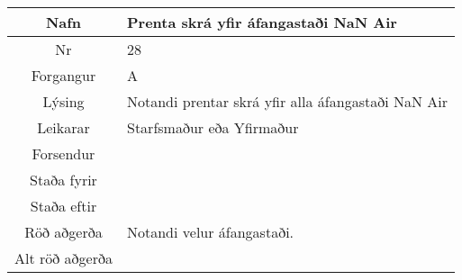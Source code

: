\documentclass[a4paper]{article}
\begin{document}
\begin{tabular}{|c|p{10cm}|}
\hline
Nafn&Prenta skrá yfir áfangastaði NaN Air\\
\hline
Nr&28\\
\hline
Forgangur&A\\
\hline
Lýsing&Notandi prentar skrá yfir alla áfangastaði NaN Air\\
\hline
Leikarar&Starfsmaður eða Yfirmaður\\
\hline
Forsendur&\\
\hline
Staða fyrir&\\
\hline
Staða eftir&\\
\hline
Röð aðgerða&Notandi velur áfangastaði.\\
\hline
Alt röð aðgerða&\\
\hline
\end{tabular}
\end{document}
